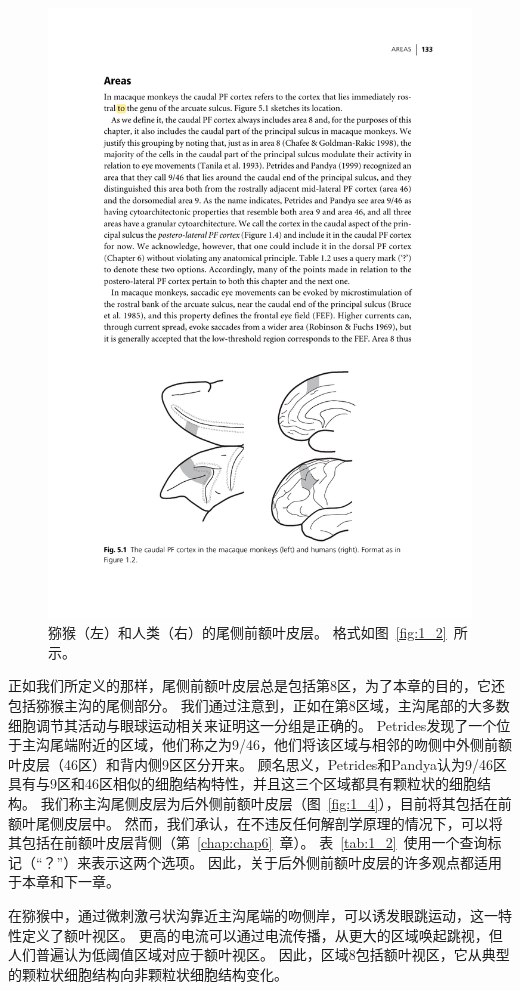 \begin{figure}
	\centering
	\includegraphics[width=0.7\linewidth]{image_pfc/Fig_5_1}
	\caption{猕猴（左）和人类（右）的尾侧前额叶皮层。
		格式如图~\ref{fig:1_2}~所示。}
	\label{fig:fig_5_1}
\end{figure}


正如我们所定义的那样，尾侧前额叶皮层总是包括第8区，为了本章的目的，它还包括猕猴主沟的尾侧部分。
我们通过注意到，正如在第8区域\cite{chafee1998matching}，主沟尾部的大多数细胞调节其活动与眼球运动相关\cite{tanila1993regional}来证明这一分组是正确的。
Petrides\cite{petrides1999dorsolateral}发现了一个位于主沟尾端附近的区域，他们称之为9/46，他们将该区域与相邻的吻侧中外侧前额叶皮层（46区）和背内侧9区区分开来。
顾名思义，Petrides和Pandya认为9/46区具有与9区和46区相似的细胞结构特性，并且这三个区域都具有颗粒状的细胞结构。
我们称主沟尾侧皮层为后外侧前额叶皮层（图~\ref{fig:1_4}），目前将其包括在前额叶尾侧皮层中。
然而，我们承认，在不违反任何解剖学原理的情况下，可以将其包括在前额叶皮层背侧（第~\ref{chap:chap6}~章）。
表~\ref{tab:1_2}~使用一个查询标记（“？”）来表示这两个选项。
因此，关于后外侧前额叶皮层的许多观点都适用于本章和下一章。


在猕猴中，通过微刺激弓状沟靠近主沟尾端的吻侧岸，可以诱发眼跳运动\cite{bruce1985primate}，这一特性定义了额叶视区。
更高的电流可以通过电流传播，从更大的区域唤起跳视\cite{robinson1969eye}，但人们普遍认为低阈值区域对应于额叶视区。
因此，区域8包括额叶视区，它从典型的颗粒状细胞结构向非颗粒状细胞结构变化\cite{stanton1989cytoarchitectural}。


